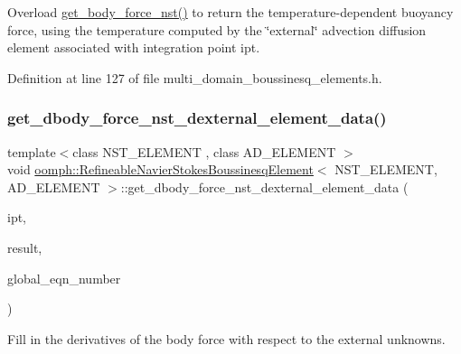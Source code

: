 Overload \hyperlink{classoomph_1_1RefineableNavierStokesBoussinesqElement_a7c422f8666f9acef4d26f187a4dc4e28}{get\+\_\+body\+\_\+force\+\_\+nst()} to return the temperature-\/dependent buoyancy force, using the temperature computed by the \char`\"{}external\char`\"{} advection diffusion element associated with integration point {\ttfamily ipt}. 



Definition at line 127 of file multi\+\_\+domain\+\_\+boussinesq\+\_\+elements.\+h.

\mbox{\label{classoomph_1_1RefineableNavierStokesBoussinesqElement_a4450f88be1c003160b9fa99df70a923b}} 
\subsubsection{\texorpdfstring{get\+\_\+dbody\+\_\+force\+\_\+nst\+\_\+dexternal\+\_\+element\+\_\+data()}{get\_dbody\_force\_nst\_dexternal\_element\_data()}}
{\footnotesize\ttfamily template$<$class N\+S\+T\+\_\+\+E\+L\+E\+M\+E\+NT , class A\+D\+\_\+\+E\+L\+E\+M\+E\+NT $>$ \\
void \hyperlink{classoomph_1_1RefineableNavierStokesBoussinesqElement}{oomph\+::\+Refineable\+Navier\+Stokes\+Boussinesq\+Element}$<$ N\+S\+T\+\_\+\+E\+L\+E\+M\+E\+NT, A\+D\+\_\+\+E\+L\+E\+M\+E\+NT $>$\+::get\+\_\+dbody\+\_\+force\+\_\+nst\+\_\+dexternal\+\_\+element\+\_\+data (\begin{DoxyParamCaption}\item[{const unsigned \&}]{ipt,  }\item[{Dense\+Matrix$<$ double $>$ \&}]{result,  }\item[{Vector$<$ unsigned $>$ \&}]{global\+\_\+eqn\+\_\+number }\end{DoxyParamCaption})}



Fill in the derivatives of the body force with respect to the external unknowns. 

